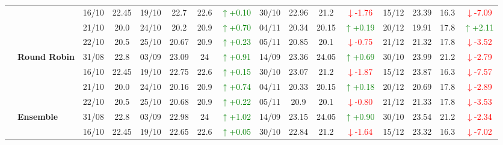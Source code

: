 \documentclass{ieeeaccess}
\begin{document}
{\begin{longtable}{llcc|cccc|cccc|cccc}
& 
& 16/10 & 22.45 & 19/10 & 22.7 & 22.6 & \textcolor{green}{\(\uparrow\)+0.10} & 30/10 & 22.96 & 21.2 & \textcolor{red}{\(\downarrow\)-1.76} & 15/12 & 23.39 & 16.3 & \textcolor{red}{\(\downarrow\)-7.09} \\

& 
& 21/10 & 20.0 & 24/10 & 20.2 & 20.9 & \textcolor{green}{\(\uparrow\)+0.70} & 04/11 & 20.34 & 20.15 & \textcolor{green}{\(\uparrow\)+0.19} & 20/12 & 19.91 & 17.8 & \textcolor{green}{\(\uparrow\)+2.11} \\

&
& 22/10 & 20.5 & 25/10 & 20.67 & 20.9 & \textcolor{green}{\(\uparrow\)+0.23} & 05/11 & 20.85 & 20.1 & \textcolor{red}{\(\downarrow\)-0.75} & 21/12 & 21.32 & 17.8 & \textcolor{red}{\(\downarrow\)-3.52} \\
\cmidrule(lr){2-16}


& \textbf{Round Robin}
& 31/08 & 22.8 & 03/09 & 23.09 & 24 & \textcolor{green}{\(\uparrow\)+0.91} & 14/09 & 23.36 & 24.05 & \textcolor{green}{\(\uparrow\)+0.69} & 30/10 & 23.99 & 21.2 & \textcolor{red}{\(\downarrow\)-2.79} \\

&
& 16/10 & 22.45 & 19/10 & 22.75 & 22.6 & \textcolor{green}{\(\uparrow\)+0.15} & 30/10 & 23.07 & 21.2 & \textcolor{red}{\(\downarrow\)-1.87} & 15/12 & 23.87 & 16.3 & \textcolor{red}{\(\downarrow\)-7.57} \\

&
& 21/10 & 20.0 & 24/10 & 20.16 & 20.9 & \textcolor{green}{\(\uparrow\)+0.74} & 04/11 & 20.33 & 20.15 & \textcolor{green}{\(\uparrow\)+0.18} & 20/12 & 20.69 & 17.8 & \textcolor{red}{\(\downarrow\)-2.89} \\

&
& 22/10 & 20.5 & 25/10 & 20.68 & 20.9 & \textcolor{green}{\(\uparrow\)+0.22} & 05/11 & 20.9 & 20.1 & \textcolor{red}{\(\downarrow\)-0.80} & 21/12 & 21.33 & 17.8 & \textcolor{red}{\(\downarrow\)-3.53} \\
\cmidrule(lr){2-16}


& \textbf{Ensemble}
& 31/08 & 22.8 & 03/09 & 22.98 & 24 & \textcolor{green}{\(\uparrow\)+1.02} & 14/09 & 23.15 & 24.05 & \textcolor{green}{\(\uparrow\)+0.90} & 30/10 & 23.54 & 21.2 & \textcolor{red}{\(\downarrow\)-2.34} \\

&
& 16/10 & 22.45 & 19/10 & 22.65 & 22.6 & \textcolor{green}{\(\uparrow\)+0.05} & 30/10 & 22.84 & 21.2 & \textcolor{red}{\(\downarrow\)-1.64} & 15/12 & 23.32 & 16.3 & \textcolor{red}{\(\downarrow\)-7.02} \\


\end{longtable}}
\end{document}
